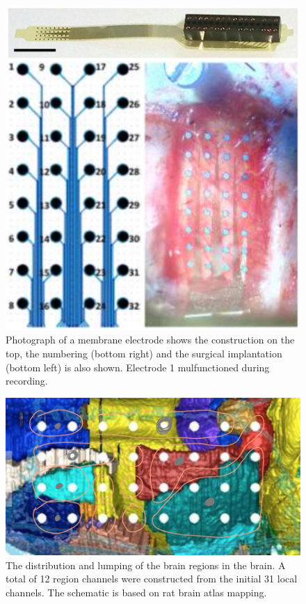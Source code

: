 \documentclass[journal,12pt,onecolumn,draftclsnofoot]{IEEEtran}  %
\begin{document}
\begin{figure}[!h]
  \centering
  \includegraphics[width=0.95\linewidth]{figures/rat_scull_and_instrument.png}
  \caption{Photograph of a membrane electrode shows the construction on the top, the numbering (bottom right) and the surgical implantation (bottom left) is also shown. Electrode 1 mulfunctioned during recording.}
  \label{fig:rat_scull_and_instrument}
\end{figure}


\begin{figure}[!h]
  \centering
  \includegraphics[width=0.95\linewidth]{figures/brain_region_lump.png}
  \caption{The distribution and lumping of the brain regions in the brain. A total of 12 region channels were constructed from the initial 31 local channels. The schematic is based on rat brain atlas mapping.}
  \label{fig:brain_region_lumping}
\end{figure}
\end{document}
